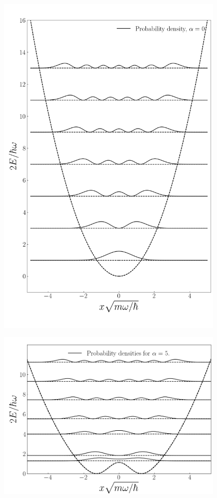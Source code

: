 \documentclass[twocolumn]{article}
\begin{document}
\begin{large}
\begin{figure}
    \centering
    \includegraphics[scale=0.35]{har_osc_density.png}
\end{figure}
\begin{figure}
    \centering
    \includegraphics[scale=0.35]{alpha5_density.png}

\end{figure}
\end{large}
\end{document}
